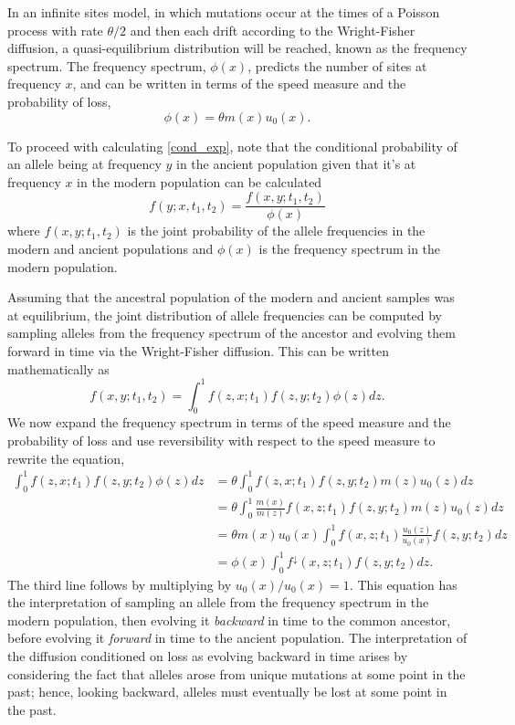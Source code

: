 \documentclass[11pt, oneside]{article}   	%
\begin{document}
In an infinite sites model, in which mutations occur at the times of a Poisson process with rate $\theta/2$ and then each drift according to the Wright-Fisher diffusion, a quasi-equilibrium distribution will be reached, known as the frequency spectrum. The frequency spectrum, $\phi(x)$, predicts the number of sites at frequency $x$, and can be written in terms of the speed measure and the probability of loss,
\[
\phi(x) = \theta m(x)u_0(x).
\]

To proceed with calculating \eqref{cond_exp}, note that the conditional probability of an allele being at frequency $y$ in the ancient population given that it's at frequency $x$ in the modern population can be calculated 
\[
f(y; x, t_1, t_2) = \frac{f(x, y; t_1, t_2)}{\phi(x)}
\]
where $f(x, y; t_1, t_2)$ is the joint probability of the allele frequencies in the modern and ancient populations and $\phi(x)$ is the frequency spectrum in the modern population.

Assuming that the ancestral population of the modern and ancient samples was at equilibrium, the joint distribution of allele frequencies can be computed by sampling alleles from the frequency spectrum of the ancestor and evolving them forward in time via the Wright-Fisher diffusion. This can be written mathematically as
\[
f(x, y; t_1, t_2) = \int_0^1 f(z, x; t_1) f(z, y; t_2) \phi(z) dz.
\]
We now expand the frequency spectrum in terms of the speed measure and the probability of loss and use reversibility with respect to the speed measure to rewrite the equation,
\begin{align*}
\int_0^1 f(z, x; t_1) f(z, y; t_2) \phi(z) dz &= \theta \int_0^1 f(z, x; t_1)f(z, y; t_2)m(z)u_0(z)dz \\
&= \theta \int_0^1 \frac{m(x)}{m(z)}f(x,z;t_1)f(z,y;t_2)m(z)u_0(z)dz \\
&= \theta m(x) u_0(x) \int_0^1 f(x,z; t_1)\frac{u_0(z)}{u_0(x)} f(z,y;t_2) dz \\
&= \phi(x) \int_0^1 f^{\downarrow}(x, z; t_1)f(z, y; t_2)dz.
\end{align*}
The third line follows by multiplying by $u_0(x)/u_0(x)  = 1$. This equation has the interpretation of sampling an allele from the frequency spectrum in the modern population, then evolving it \emph{backward} in time to the common ancestor, before evolving it \emph{forward} in time to the ancient population. The interpretation of the diffusion conditioned on loss as evolving backward in time arises by considering the fact that alleles arose from unique mutations at some point in the past; hence, looking backward, alleles must eventually be lost at some point in the past.
\end{document}
